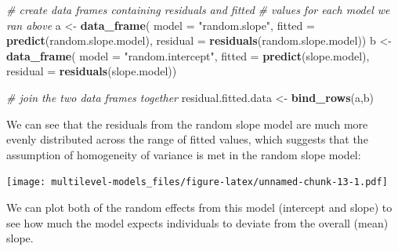 \documentclass[]{article}
\newenvironment{Shaded}{\begin{snugshade}}{\end{snugshade}}
\newcommand{\KeywordTok}[1]{\textcolor[rgb]{0.13,0.29,0.53}{\textbf{#1}}}
\newcommand{\DataTypeTok}[1]{\textcolor[rgb]{0.13,0.29,0.53}{#1}}
\newcommand{\StringTok}[1]{\textcolor[rgb]{0.31,0.60,0.02}{#1}}
\newcommand{\CommentTok}[1]{\textcolor[rgb]{0.56,0.35,0.01}{\textit{#1}}}
\newcommand{\OperatorTok}[1]{\textcolor[rgb]{0.81,0.36,0.00}{\textbf{#1}}}
\newcommand{\NormalTok}[1]{#1}
\theoremstyle{definition}
\theoremstyle{definition}
\theoremstyle{definition}
\theoremstyle{remark}
\begin{document}
\begin{Shaded}
\begin{Highlighting}[]
\CommentTok{# create data frames containing residuals and fitted}
\CommentTok{# values for each model we ran above}
\NormalTok{a <-}\StringTok{  }\KeywordTok{data_frame}\NormalTok{(}
    \DataTypeTok{model =} \StringTok{"random.slope"}\NormalTok{,}
    \DataTypeTok{fitted =} \KeywordTok{predict}\NormalTok{(random.slope.model), }
    \DataTypeTok{residual =} \KeywordTok{residuals}\NormalTok{(random.slope.model))}
\NormalTok{b <-}\StringTok{ }\KeywordTok{data_frame}\NormalTok{(}
    \DataTypeTok{model =} \StringTok{"random.intercept"}\NormalTok{,}
    \DataTypeTok{fitted =} \KeywordTok{predict}\NormalTok{(slope.model), }
    \DataTypeTok{residual =} \KeywordTok{residuals}\NormalTok{(slope.model)) }

\CommentTok{# join the two data frames together}
\NormalTok{residual.fitted.data <-}\StringTok{ }\KeywordTok{bind_rows}\NormalTok{(a,b)}
\end{Highlighting}
\end{Shaded}

We can see that the residuals from the random slope model are much more
evenly distributed across the range of fitted values, which suggests
that the assumption of homogeneity of variance is met in the random
slope model:

\begin{Shaded}
\end{Shaded}

\texttt{[image: multilevel-models\_files/figure-latex/unnamed-chunk-13-1.pdf]}

We can plot both of the random effects from this model (intercept and
slope) to see how much the model expects individuals to deviate from the
overall (mean) slope.
\end{document}
